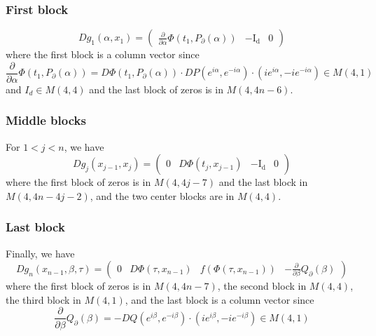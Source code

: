 \documentclass[10pt]{article}
\newcommand{\pardiff}[2]{\frac{\partial #1}{\partial #2}}
\begin{document}
\subsubsection*{First block}
\[
Dg_1(\alpha, x_1) = 
\begin{pmatrix}
\pardiff{}{\alpha} \Phi(t_1, P_\partial(\alpha)) & -\operatorname{I_d} & 0
\end{pmatrix}
\]
where the first block is a column vector since
\[
\pardiff{}{\alpha} \Phi(t_1, P_\partial(\alpha)) = D\Phi(t_1, P_\partial(\alpha)) \cdot DP(e^{i\alpha}, e^{-i \alpha}) \cdot  \left(i e^{i\alpha}, -i e^{-i\alpha}\right) \in M(4,1)
\]
and $I_d \in M(4,4)$ and the last block of zeros is in $M(4, 4n-6)$.

\subsubsection*{Middle blocks}
For $1 < j < n$, we have
\[
Dg_j(x_{j-1}, x_j) = 
\begin{pmatrix}
0 & D \Phi(t_j, x_{j-1}) & -\operatorname{I_d} & 0
\end{pmatrix}
\]
where the first block of zeros is in $M(4, 4j-7)$ and the last block in $M(4, 4n - 4j - 2)$, and the two center blocks are in $M(4,4)$. 

\subsubsection*{Last block}
Finally, we have 
\[
Dg_n(x_{n-1}, \beta, \tau) = 
\begin{pmatrix}
0 & D \Phi(\tau, x_{n-1}) & f \left(\Phi(\tau, x_{n-1})\right) & - \pardiff{}{\beta} Q_\partial(\beta)
\end{pmatrix}
\]
where the first block of zeros is in $M(4, 4n-7)$, the second block in $M(4,4)$, the third block in $M(4,1)$, and the last block is a column vector since
\[
\pardiff{}{\beta} Q_\partial(\beta) = -DQ(e^{i \beta}, e^{-i \beta}) \cdot (i e^{i\beta}, -ie^{-i \beta}) \in M(4,1)
\]
\end{document}
